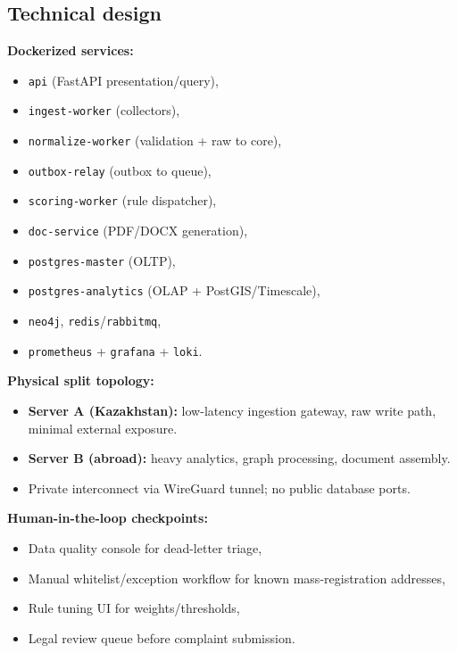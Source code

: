\documentclass[11pt,a4paper]{article}
\begin{document}
\subsection{Technical design}
\textbf{Dockerized services:}
\begin{itemize}[leftmargin=1.4em]
  \item \texttt{api} (FastAPI presentation/query),
  \item \texttt{ingest-worker} (collectors),
  \item \texttt{normalize-worker} (validation + raw to core),
  \item \texttt{outbox-relay} (outbox to queue),
  \item \texttt{scoring-worker} (rule dispatcher),
  \item \texttt{doc-service} (PDF/DOCX generation),
  \item \texttt{postgres-master} (OLTP),
  \item \texttt{postgres-analytics} (OLAP + PostGIS/Timescale),
  \item \texttt{neo4j}, \texttt{redis}/\texttt{rabbitmq},
  \item \texttt{prometheus} + \texttt{grafana} + \texttt{loki}.
\end{itemize}

\textbf{Physical split topology:}
\begin{itemize}[leftmargin=1.4em]
  \item \textbf{Server A (Kazakhstan):} low-latency ingestion gateway, raw write path, minimal external exposure.
  \item \textbf{Server B (abroad):} heavy analytics, graph processing, document assembly.
  \item Private interconnect via WireGuard tunnel; no public database ports.
\end{itemize}

\textbf{Human-in-the-loop checkpoints:}
\begin{itemize}[leftmargin=1.4em]
  \item Data quality console for dead-letter triage,
  \item Manual whitelist/exception workflow for known mass-registration addresses,
  \item Rule tuning UI for weights/thresholds,
  \item Legal review queue before complaint submission.
\end{itemize}
\end{document}
